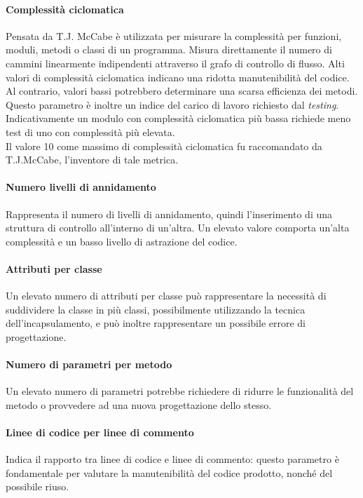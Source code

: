 \paragraph{Complessità ciclomatica}
Pensata da T.J. McCabe è utilizzata per misurare la complessità per funzioni, moduli, metodi o classi di un programma. Misura direttamente il numero di cammini linearmente indipendenti attraverso il grafo di controllo di flusso.
Alti valori di complessità ciclomatica indicano una ridotta manutenibilità del codice. Al contrario, valori bassi potrebbero determinare una scarsa efficienza dei metodi. Questo parametro è inoltre un indice del carico di lavoro richiesto dal \textit{testing}. Indicativamente un modulo con complessità ciclomatica più bassa richiede meno test di uno con complessità più elevata.\\
Il valore 10 come massimo di complessità ciclomatica fu raccomandato da T.J.McCabe, l'inventore di tale metrica.
\paragraph{Numero livelli di annidamento}
Rappresenta il numero di livelli di annidamento, quindi l'inserimento di una struttura di controllo all'interno di un'altra. Un elevato valore comporta un'alta complessità e un basso livello di astrazione del codice.\\

\paragraph{Attributi per classe}
Un elevato numero di attributi per classe può rappresentare la necessità di suddividere la classe in più classi, possibilmente utilizzando la tecnica dell'incapsulamento, e può inoltre rappresentare un possibile errore di progettazione.\\

\paragraph{Numero di parametri per metodo}
Un elevato numero di parametri potrebbe richiedere di ridurre le funzionalità del metodo o provvedere ad una nuova progettazione dello stesso.\\

\paragraph{Linee di codice per linee di commento}
Indica il rapporto tra linee di codice e linee di commento: questo parametro è fondamentale per valutare la manutenibilità del codice prodotto, nonché del possibile riuso.\\


